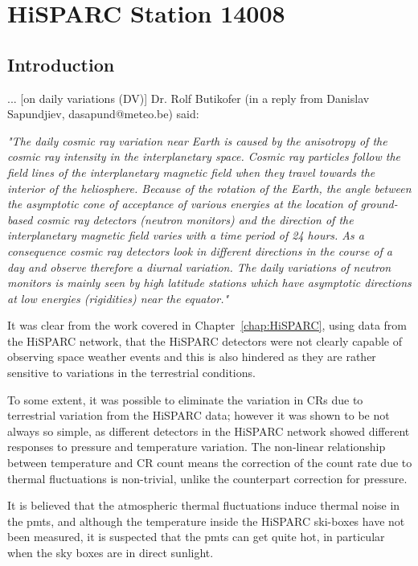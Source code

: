 \chapter{HiSPARC Station 14008}\label{chap:HiSPARC_14008}

\section{Introduction}\label{sec:HS_14008_intro}


... [on daily variations (DV)] Dr. Rolf Butikofer (in a reply from Danislav Sapundjiev, dasapund@meteo.be) said:

\textit{"The daily cosmic ray variation near Earth is caused by the anisotropy of the cosmic ray intensity in the interplanetary space. Cosmic ray particles follow the field lines of the interplanetary magnetic field when they travel towards the interior of the heliosphere. Because of the rotation of the Earth, the angle between the asymptotic cone of acceptance of various energies at the location of ground-based cosmic ray detectors (neutron monitors) and the direction of the interplanetary magnetic field varies with a time period of 24 hours. As a consequence cosmic ray detectors look in different directions in the course of a day and observe therefore a diurnal variation. The daily variations of neutron monitors is mainly seen by high latitude stations which have asymptotic directions at low energies (rigidities) near the equator."}



It was clear from the work covered in Chapter~\ref{chap:HiSPARC}, using data from the HiSPARC network, that the HiSPARC detectors were not clearly capable of observing space weather events and this is also hindered as they are rather sensitive to variations in the terrestrial conditions. 

To some extent, it was possible to eliminate the variation in CRs due to terrestrial variation from the HiSPARC data; however it was shown to be not always so simple, as different detectors in the HiSPARC network showed different responses to pressure and temperature variation. The non-linear relationship between temperature and CR count means the correction of the count rate due to thermal fluctuations is non-trivial, unlike the counterpart correction for pressure. 

It is believed that the atmospheric thermal fluctuations induce thermal noise in the \glspl{pmt}, and although the temperature inside the HiSPARC ski-boxes have not been measured, it is suspected that the \glspl{pmt} can get quite hot, in particular when the sky boxes are in direct sunlight.

